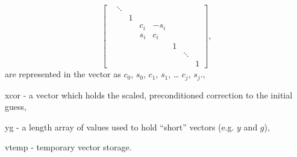 \begin{args}
\begin{equation*}
\begin{bmatrix}
        & \ddots &   &     &      &   &        &   \\
        &        & 1 &     &      &   &        &   \\
        &        &   & c_i & -s_i &   &        &   \\
        &        &   & s_i &  c_i &   &        &   \\
        &        &   &     &      & 1 &        &   \\
        &        &   &     &      &   & \ddots &   \\
        &        &   &     &      &   &        & 1\end{bmatrix},
    \end{equation*}
    are represented in the  vector as 
    $c_0$,  $s_0$,  $c_1$,
     $s_1$, \ldots {} $c_j$,
     $s_j$.,
  \item[xcor] - a vector which holds the scaled, preconditioned
    correction to the initial guess,
  \item[yg] - a length  array of  values
    used to hold ``short'' vectors (e.g. $y$ and $g$),
  \item[vtemp] - temporary vector storage.
\end{args}

